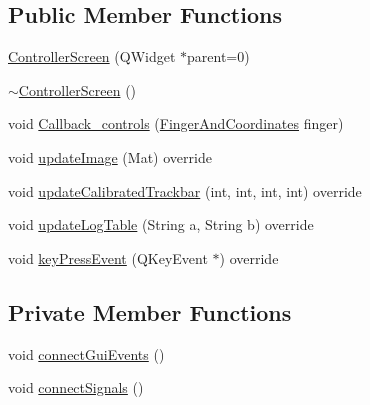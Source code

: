 \subsection*{Public Member Functions}
\begin{DoxyCompactItemize}
\item 
\hyperlink{class_controller_screen_aecef7737326dbb37945e6a9eac6dcede}{Controller\+Screen} (Q\+Widget $\ast$parent=0)
\item 
\hyperlink{class_controller_screen_a4871b73dbeec4679ba6bee692bfe71a9}{$\sim$\+Controller\+Screen} ()
\item 
void \hyperlink{class_controller_screen_a54062624a4a89d8bf392ab5fa66ac5ff}{Callback\+\_\+controls} (\hyperlink{class_gesture_detection_1_1_finger_and_coordinates}{Finger\+And\+Coordinates} finger)
\item 
void \hyperlink{class_controller_screen_acf75ddc9588011e360e2199cc37478ec}{update\+Image} (Mat) override
\item 
void \hyperlink{class_controller_screen_a700c8c1911e68861b86890a5429d2692}{update\+Calibrated\+Trackbar} (int, int, int, int) override
\item 
void \hyperlink{class_controller_screen_a039b816adc94fc7e7757520c10fd1d0b}{update\+Log\+Table} (String a, String b) override
\item 
void \hyperlink{class_controller_screen_afbb0033f9be00fce83d54f2a49b9ba89}{key\+Press\+Event} (Q\+Key\+Event $\ast$) override
\end{DoxyCompactItemize}
\subsection*{Private Member Functions}
\begin{DoxyCompactItemize}
\item 
void \hyperlink{class_controller_screen_acf89cc74ff8383884d11a067b3243d4a}{connect\+Gui\+Events} ()
\item 
void \hyperlink{class_controller_screen_af7c789ddca1dece0fb0585e84aeb5e81}{connect\+Signals} ()
\end{DoxyCompactItemize}
